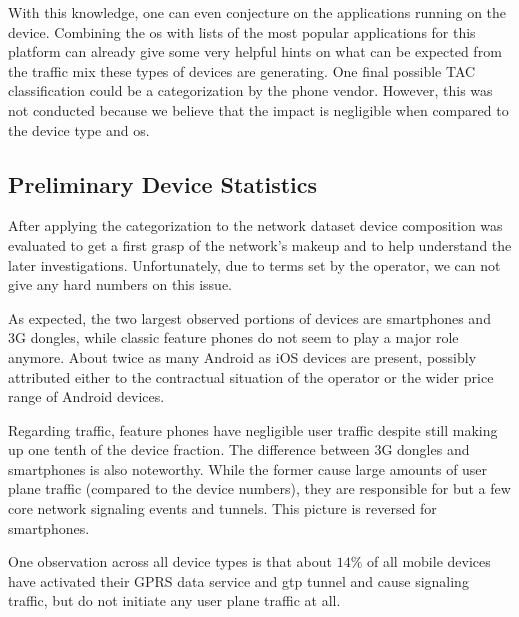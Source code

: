 With this knowledge, one can even conjecture on the applications running on the device. Combining the \gls{os} with lists of the most popular applications for this platform can already give some very helpful hints on what can be expected from the traffic mix these types of devices are generating. One final possible \gls{TAC} classification could be a categorization by the phone vendor. However, this was not conducted because we believe that the impact is negligible when compared to the device type and \gls{os}.


\subsection{Preliminary Device Statistics}

After applying the categorization to the network dataset device composition was evaluated to get a first grasp of the network's makeup and to help understand the later investigations. Unfortunately, due to terms set by the operator, we can not give any hard numbers on this issue.

As expected, the two largest observed portions of devices are smartphones and \gls{3G} dongles, while classic feature phones do not seem to play a major role anymore. About twice as many Android as iOS devices are present, possibly attributed either to the contractual situation of the operator or the wider price range of Android devices.

Regarding traffic, feature phones have negligible user traffic despite still making up one tenth of the device fraction. The difference between \gls{3G} dongles and smartphones is also noteworthy. While the former cause large amounts of user plane traffic (compared to the device numbers), they are responsible for but a few core network signaling events and tunnels. This picture is reversed for smartphones.

One observation across all device types is that about $14\%$ of all mobile devices have activated their \gls{GPRS} data service and \gls{gtp} tunnel and cause signaling traffic, but do not initiate any user plane traffic at all.